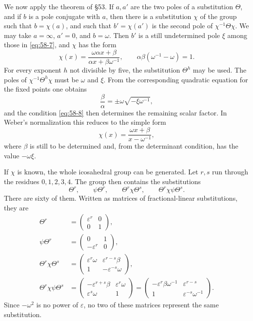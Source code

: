 \documentclass[11pt,a4paper]{article}
\newcommand{\eps}{\varepsilon}
\begin{document}
We now apply the theorem of \S 53.  If \(a,a'\) are the two poles of a substitution \(\Theta\), and if \(b\) is a pole conjugate with \(a\), then there is a substitution \(\chi\) of the group such that \(b=\chi(a)\), and such that \(b'=\chi(a')\) is the second pole of \(\chi^{-1}\Theta\chi\).  We may take \(a=\infty\), \(a'=0\), and \(b=\omega\).  Then \(b'\) is a still undetermined pole \(\xi\) among those in \eqref{eq:58-7}, and \(\chi\) has the form
\begin{equation}\label{eq:58-8}
 \chi(x)=\frac{\omega\alpha x+\beta}{\alpha x+\beta\omega^{-1}},
 \qquad \alpha\beta(\omega^{-1}-\omega)=1.
\end{equation}
For every exponent \(h\) not divisible by five, the substitution \(\Theta^h\) may be used.  The poles of \(\chi^{-1}\Theta^h\chi\) must be \(\omega\) and \(\xi\).  From the corresponding quadratic equation for the fixed points one obtains
\[
 \frac{\beta}{\alpha}=\pm\omega\sqrt{-\xi\omega^{-1}},
\]
and the condition \eqref{eq:58-8} then determines the remaining scalar factor.  In Weber's normalization this reduces to the simple form
\begin{equation}\label{eq:58-9}
 \chi(x)=\frac{\omega x+\beta}{x-\omega^{-1}},
\end{equation}
where \(\beta\) is still to be determined and, from the determinant condition, has the value \(-\omega\xi\).

If \(\chi\) is known, the whole icosahedral group can be generated.  Let \(r,s\) run through the residues \(0,1,2,3,4\).  The group then contains the substitutions
\begin{equation}\label{eq:58-10}
 \Theta^r,
 \qquad \psi\Theta^r,
 \qquad \Theta^r\chi\Theta^s,
 \qquad \Theta^r\chi\psi\Theta^s.
\end{equation}
There are sixty of them.  Written as matrices of fractional-linear substitutions, they are
\begin{align}
 \Theta^r&=\begin{pmatrix}\eps^r&0\\0&1\end{pmatrix},\label{eq:58-11}\\
 \psi\Theta^r&=\begin{pmatrix}0&1\\-\eps^r&0\end{pmatrix},\label{eq:58-12}\\
 \Theta^r\chi\Theta^s
 &=\begin{pmatrix}\eps^r\omega&\eps^{r-s}\beta\\1&-\eps^{-s}\omega\end{pmatrix},\label{eq:58-13}\\
 \Theta^r\chi\psi\Theta^s
 &=\begin{pmatrix}-\eps^{r+s}\beta&\eps^r\omega\\ \eps^s\omega&1\end{pmatrix}
  =\begin{pmatrix}-\eps^r\beta\omega^{-1}&\eps^{r-s}\\1&\eps^{-s}\omega^{-1}\end{pmatrix}.
  \label{eq:58-14}
\end{align}
Since \(-\omega^2\) is no power of \(\eps\), no two of these matrices represent the same substitution.
\end{document}
